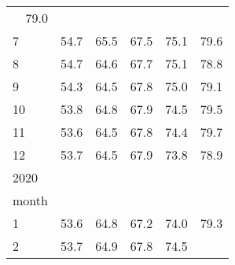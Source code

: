 \begin{tabular}{llllll}
  \multicolumn{1}{r}{79.0} \\
\multicolumn{1}{l}{\hspace{3em}7} &
  \multicolumn{1}{|r}{54.7} &
  \multicolumn{1}{r}{65.5} &
  \multicolumn{1}{r}{67.5} &
  \multicolumn{1}{r}{75.1} &
  \multicolumn{1}{r}{79.6} \\
\multicolumn{1}{l}{\hspace{3em}8} &
  \multicolumn{1}{|r}{54.7} &
  \multicolumn{1}{r}{64.6} &
  \multicolumn{1}{r}{67.7} &
  \multicolumn{1}{r}{75.1} &
  \multicolumn{1}{r}{78.8} \\
\multicolumn{1}{l}{\hspace{3em}9} &
  \multicolumn{1}{|r}{54.3} &
  \multicolumn{1}{r}{64.5} &
  \multicolumn{1}{r}{67.8} &
  \multicolumn{1}{r}{75.0} &
  \multicolumn{1}{r}{79.1} \\
\multicolumn{1}{l}{\hspace{3em}10} &
  \multicolumn{1}{|r}{53.8} &
  \multicolumn{1}{r}{64.8} &
  \multicolumn{1}{r}{67.9} &
  \multicolumn{1}{r}{74.5} &
  \multicolumn{1}{r}{79.5} \\
\multicolumn{1}{l}{\hspace{3em}11} &
  \multicolumn{1}{|r}{53.6} &
  \multicolumn{1}{r}{64.5} &
  \multicolumn{1}{r}{67.8} &
  \multicolumn{1}{r}{74.4} &
  \multicolumn{1}{r}{79.7} \\
\multicolumn{1}{l}{\hspace{3em}12} &
  \multicolumn{1}{|r}{53.7} &
  \multicolumn{1}{r}{64.5} &
  \multicolumn{1}{r}{67.9} &
  \multicolumn{1}{r}{73.8} &
  \multicolumn{1}{r}{78.9} \\
\multicolumn{1}{l}{\hspace{1em}2020} &
  \multicolumn{1}{|r}{} &
  \multicolumn{1}{r}{} &
  \multicolumn{1}{r}{} &
  \multicolumn{1}{r}{} &
  \multicolumn{1}{r}{} \\
\multicolumn{1}{l}{\hspace{2em}month} &
  \multicolumn{1}{|r}{} &
  \multicolumn{1}{r}{} &
  \multicolumn{1}{r}{} &
  \multicolumn{1}{r}{} &
  \multicolumn{1}{r}{} \\
\multicolumn{1}{l}{\hspace{3em}1} &
  \multicolumn{1}{|r}{53.6} &
  \multicolumn{1}{r}{64.8} &
  \multicolumn{1}{r}{67.2} &
  \multicolumn{1}{r}{74.0} &
  \multicolumn{1}{r}{79.3} \\
\multicolumn{1}{l}{\hspace{3em}2} &
  \multicolumn{1}{|r}{53.7} &
  \multicolumn{1}{r}{64.9} &
  \multicolumn{1}{r}{67.8} &
  \multicolumn{1}{r}{74.5} &

\end{tabular}
